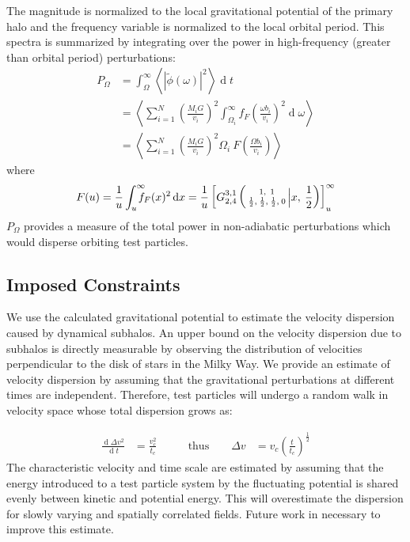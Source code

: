\documentclass[usenatbib]{mnras}
\renewcommand{\d}[1]{\ensuremath{\operatorname{d}\!{#1}}}
\begin{document}
The magnitude is normalized to the local
gravitational potential of the primary halo
and the frequency variable is normalized to
the local orbital period. This spectra is
summarized by integrating
over the power in high-frequency
(greater than orbital period) perturbations:
\begin{align}
P_{\Omega} &= \int_{\Omega}^{\infty} \! \left<\left| \tilde{\phi}(\omega) \right|^2 \right> \d{t} \\ &= \left< \sum_{i = 1}^N \left(\frac{M_iG}{v_i}\right)^2 \int_{\Omega_i}^{\infty} \! f_F\left(\frac{\omega b_i}{v_i} \right)^2 \d{\omega} \right> \\
&= \left< \sum_{i = 1}^N \left(\frac{M_iG}{v_i}\right)^2 \Omega_i \: F\! \left(\frac{\Omega b_i}{v_i} \right) \right>
\end{align} where 
\begin{equation}
F(u) = \frac{1}{u} \int_{u}^{\infty}\!\!\!\!\! f_F(x)^2 \d{x} = \frac{1}{u} \left[ G_{2, 4}^{3, 1} \left( \begin{smallmatrix} 1, \: \: 1 \\ \small\frac{1}{2}, \: \small\frac{1}{2}, \: \small\frac{1}{2}, \: 0 \end{smallmatrix} \Big| x, \: \frac{1}{2} \right) \right]^{\infty}_{u}
\end{equation}
$P_{\Omega}$ provides a measure of the total power in non-adiabatic perturbations which would
disperse orbiting test particles.


\subsection{Imposed Constraints}

We use the calculated gravitational potential to estimate the velocity dispersion caused by dynamical subhalos. An upper bound on the velocity dispersion due to subhalos is directly measurable by observing the distribution of velocities perpendicular to the disk of stars in the Milky Way. We provide an estimate of velocity dispersion by assuming that the gravitational perturbations at different times are independent. Therefore, test particles will undergo a random walk in velocity space whose total dispersion grows as:

\begin{align}
\frac{\d{ \Delta v^2}}{\d{t}} &= \frac{v_c^2}{t_c} &\qquad\text{thus}\qquad \Delta v &= v_c \left(\frac{t}{t_c}\right)^{\frac{1}{2}}
\end{align}
The characteristic velocity and time scale are estimated by assuming that the energy introduced to a test particle system by the fluctuating potential is shared evenly between kinetic and potential energy. This will overestimate the dispersion for slowly varying and spatially correlated fields. Future work in necessary to improve this estimate.
\end{document}
